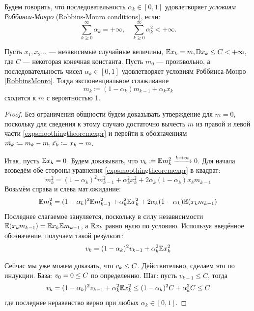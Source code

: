 \begin{definition}
Будем говорить, что последовательность $\alpha_k \in [0, 1]$ удовлетворяет \emph{условиям Роббинса-Монро} (Robbins-Monro conditions), если:
\begin{equation}\label{RobbinsMonro}
\sum_{k \ge 0}^{\infty} \alpha_k = +\infty, \quad \sum_{k \ge 0}^{\infty} \alpha_k^2 < +\infty.
\end{equation}
\end{definition}

\begin{theoremBox}[label=th:expsmoothingconvergence]{}
Пусть $x_1, x_2 \dots$ --- независимые случайные величины, $\mathbb{E} x_k = m, \mathbb{D} x_k \le C < +\infty$, где $C$ --- некоторая конечная константа. Пусть $m_0$ --- произвольно, а последовательность чисел $\alpha_k \in [0, 1]$ удовлетворяет условиям Роббинса-Монро \eqref{RobbinsMonro}. Тогда экспоненциальное сглаживание 
\begin{equation}\label{expsmoothingtheoremexpr}
m_k \coloneqq (1 - \alpha_k) m_{k-1} + \alpha_k x_k
\end{equation}
сходится к $m$ с вероятностью 1.
\begin{proof}
Без ограничения общности будем доказывать утверждение для $m = 0$, поскольку для сведения к этому случаю достаточно вычесть $m$ из правой и левой части \eqref{expsmoothingtheoremexpr} и перейти к обозначениям $\hat{m_k} \HM\coloneqq m_k - m, \hat{x_k} \HM\coloneqq x_k \HM- m$.

Итак, пусть $\E x_k \HM= 0$. Будем доказывать, что $v_k \HM\coloneqq \E m_k^2 \xrightarrow{k \to \infty} 0$. Для начала возведём обе стороны уравнения \eqref{expsmoothingtheoremexpr} в квадрат:
$$m_{k}^2 = (1 - \alpha_k)^2 m^2_{k-1} + \alpha^2_k x^2_k + 2\alpha_k(1 - \alpha_k)x_km_{k-1}$$
Возьмём справа и слева мат.ожидание:
$$\mathbb{E} m_{k}^2 = (1 - \alpha_k)^2 \mathbb{E} m^2_{k-1} + \alpha^2_k \mathbb{E} x^2_k + 2\alpha_k(1 - \alpha_k)\mathbb{E} (x_k m_{k-1})$$
Последнее слагаемое зануляется, поскольку в силу независимости $\E (x_k m_{k-1}) \HM= \E x_k \E m_{k-1}$, а $\mathbb{E} x_k$ равно нулю по условию. Используя введённое обозначение, получаем такой результат:
\begin{equation}\label{recurrentdispersion}
v_{k} = (1 - \alpha_k)^2 v_{k-1} + \alpha_k^2 \mathbb{E} x_k^2
\end{equation}

Сейчас мы уже можем доказать, что $v_k \HM\le C$. Действительно, сделаем это по индукции. База: $v_0 \HM= 0 \HM\le C$ по определению. Шаг: пусть $v_{k-1} \le C$, тогда
$$v_{k} = (1 - \alpha_k)^2 v_{k-1} + \alpha_k^2 \mathbb{E} x_k^2 \le (1 - \alpha_k)^2 C + \alpha_k^2 C \le C$$
где последнее неравенство верно при любых $\alpha_k \in [0, 1]$.


\end{proof}
\end{theoremBox}
